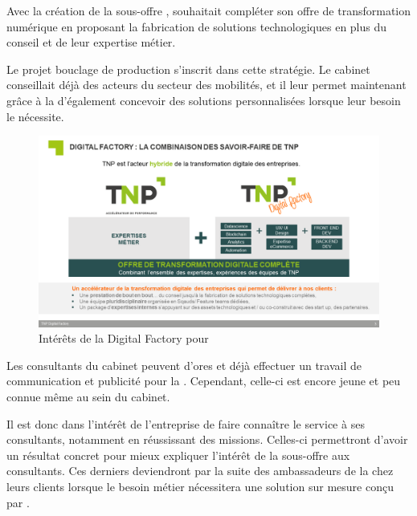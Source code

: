 Avec la création de la sous-offre \df, \tnp souhaitait compléter son offre de transformation numérique en proposant la fabrication de solutions technologiques en plus du conseil et de leur expertise métier.

Le projet bouclage de production s'inscrit dans cette stratégie. Le cabinet conseillait déjà des acteurs du secteur des mobilités, et il leur permet maintenant grâce à la \df d'également concevoir des solutions personnalisées lorsque leur besoin le nécessite.

\begin{figure}[H]
    \centering
    \includegraphics[width=1\linewidth]{img/offre_digital_factory_tnp.png}
    \caption{Intérêts de la Digital Factory pour \tnp}
\end{figure}

Les consultants du cabinet peuvent d'ores et déjà effectuer un travail de communication et publicité pour la \df. Cependant, celle-ci est encore jeune et peu connue même au sein du cabinet.

Il est donc dans l'intérêt de l'entreprise de faire connaître le service à ses consultants, notamment en réussissant des missions. Celles-ci permettront d'avoir un résultat concret pour mieux expliquer l'intérêt de la sous-offre aux consultants. Ces derniers deviendront par la suite des ambassadeurs de la \df chez leurs clients lorsque le besoin métier nécessitera une solution sur mesure conçu par \tnp.
